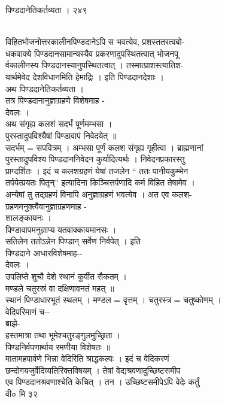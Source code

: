 \documentclass[11pt, openany]{book}
\begin{document}
{{{{{{{{{{ }{ पिण्डदानेतिकर्तव्यता । २४९}{\\
विहितभोजनोत्तरकालीनपिण्डदानेऽपि स भवत्येव, प्रशस्ततरत्वबो-\\
धकवाक्ये पिण्डदानसामान्यस्यैव प्रकरणादुपस्थितत्वात् भोजनपू\\
र्वकालीनस्य पिण्डदानस्यानुपस्थितत्वात् । तस्मात्प्राशस्त्यातिश-\\
यार्थमेवेद देशविधानमिति हेमाद्रिः । इति पिण्डदानदेशाः ।\\
अथ पिण्डदानेतिकर्तव्यता ।\\
तत्र पिण्डदानानुज्ञाग्रहणे विशेषमाह -\\
देवलः ।\\
अथ संगृह्य कलशं सदर्भं पूर्णमम्भसा ।\\
पुरस्तादुपविश्यैषां पिण्डावापं निवेदयेत् ॥\\
सदर्भम् = सपवित्रम् । अम्भसा पूर्णं कलश संगृह्य गृहीत्वा ।
ब्राह्मणानां\\
पुरस्तादुपविश्य पिण्डदाननिवेदन कुर्यादित्यर्थः । निवेदनप्रकारस्तु\\
प्राग्दर्शितः । इदं च कलशग्रहणं येषां तजलेन `` ततः पानीयकुम्भेन\\
तर्पयेत्प्रयतः पितृन्'' इत्यादिना किञ्चित्तर्पणादि कर्म विहित तेषामेव
।\\
अन्येषां तु तद्ग्रहणं विनापि अनुज्ञाग्रहणं भवत्येव । अत एव कलश-\\
ग्रहणमनुक्त्वैवानुज्ञाग्रहणमाह -\\
शालङ्कायनः ।\\
पिण्डावापमनुज्ञाप्य यतवाक्कायमानसः ।\\
सतिलेन ततोऽन्नेन पिण्डान् सर्वेण निर्वपेत् । इति\\
पिण्डदाने आधारविशेषमाह-\/-\\
देवलः ।\\
उपलिप्ते शुचौ देशे स्थानं कुर्वीत सैकतम् ।\\
मण्डले चतुरस्रं वा दक्षिणावनतं महत् ॥\\
स्थानं पिण्डाधारभूतं स्थलम् । मण्डल = वृत्तम् । चतुरस्त्र = चतुष्कोणम्
।\\
वेदिपरिमाणं च-\/-\\
ब्राझे-\\
हस्तमात्रा तथा भूमेश्चतुरङ्गुलमुच्छ्रिता ।\\
पिण्डनिर्वपणार्थाय रमणीया विशेषतः ॥\\
मातामहपार्वणे भिन्ना वेदिरिति श्राद्धकल्पः । इदं च वेदिकरणं\\
छन्दोगयजुर्वेदिव्यतिरिक्तविषयम् । तेषां वेद्यश्रवणादुच्छिष्टसमीप\\
एव पिण्डदानश्रवणाश्चेति केचित् । तन । उच्छिष्टसमीपेऽपि वेदेः कर्तुं\\
वी० मि ३२

}}}}}}}}}}
\end{document}
